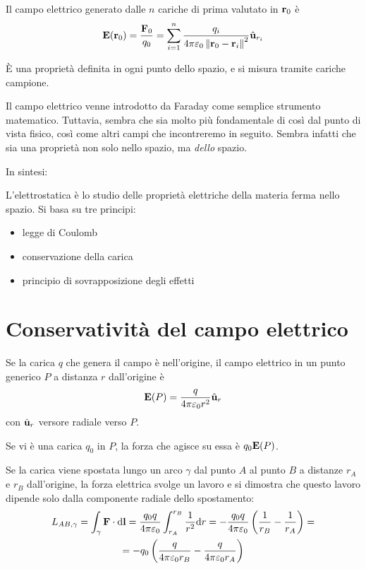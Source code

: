 Il campo elettrico generato dalle $n$ cariche di prima valutato in $\mathbf{r}_0$ è
\begin{equation}
    \mathbf{E}(\mathbf{r}_0) = \frac{\mathbf{F}_0}{q_0} = \sum_{i=1}^n \frac{q_i}{4 \pi \varepsilon_0 \left\lVert \mathbf{r}_0 - \mathbf{r}_i \right\rVert^2} \hat{\mathbf{u}}_{r_i}
\end{equation}

È una proprietà definita in ogni punto dello spazio, e si misura tramite cariche campione.

Il campo elettrico venne introdotto da Faraday come semplice strumento matematico.
Tuttavia, sembra che sia molto più fondamentale di così dal punto di vista fisico, così come altri campi che incontreremo in seguito.
Sembra infatti che sia una proprietà non solo nello spazio, ma \textit{dello} spazio.

In sintesi:

L'elettrostatica è lo studio delle proprietà elettriche della materia ferma nello spazio.
Si basa su tre principi:
\begin{itemize}
    \item legge di Coulomb
    \item conservazione della carica
    \item principio di sovrapposizione degli effetti
\end{itemize}

\section{Conservatività del campo elettrico}

Se la carica $q$ che genera il campo è nell'origine, il campo elettrico in un punto generico $P$ a distanza $r$ dall'origine è
\begin{equation}
    \mathbf{E}(P) = \frac{q}{4\pi\varepsilon_0 r^2} \hat{\mathbf{u}}_{r}
\end{equation}
con $\hat{\mathbf{u}}_{r}$ versore radiale verso $P$.

Se vi è una carica $q_0$ in $P$, la forza che agisce su essa è $q_0 \mathbf{E}(P)$.


Se la carica viene spostata lungo un arco $\gamma$ dal punto $A$ al punto $B$ a distanze $r_A$ e $r_B$ dall'origine, la forza elettrica svolge un lavoro e si dimostra che questo lavoro dipende solo dalla componente radiale dello spostamento:
\begin{equation}
\label{eq:potenziale_elettrostatico}
    \begin{gathered}
        L_{AB, \gamma} = \int_\gamma \mathbf{F} \cdot \mathrm{d} \mathbf{l} = \frac{q_0 q}{4\pi \varepsilon_0} \int_{r_A}^{r_B} \frac{1}{r^2} \mathrm{d} r = - \frac{q_0 q}{4\pi \varepsilon_0} \left( \frac{1}{r_B} - \frac{1}{r_A} \right) = \\
        = -q_0 \left( \frac{q}{4\pi \varepsilon_0 r_B} - \frac{q}{4\pi \varepsilon_0 r_A} \right)
    \end{gathered}
\end{equation}


